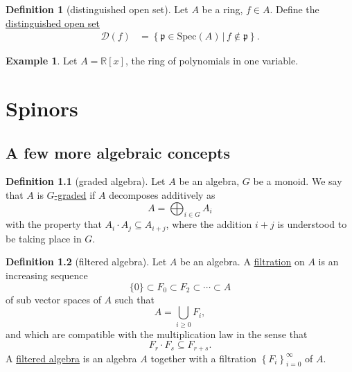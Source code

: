 \documentclass[a4paper]{report}
\newcommand{\R}{\mathbb{R}}
\newcommand{\defn}[1]{\ul{#1}}
\newcommand{\Spec}{\mathrm{Spec}}
\theoremstyle{definition}
\newtheorem{definition}{Definition}[section]
\newtheorem{example}{Example}[section]
\theoremstyle{plain}
\theoremstyle{remark}
\begin{document}
\begin{definition}[distinguished open set]
  \label{def:distinguishedopenset}
  Let $A$ be a ring, $f \in A$. Define the \defn{distinguished open set}
  \begin{align*}
    \mathcal{D}(f) &= \left\{ \mathfrak{p} \in \Spec(A)\,\big|\, f \notin \mathfrak{p} \right\}.
  \end{align*}
\end{definition}
\begin{example}
  Let $A = \R[x]$, the ring of polynomials in one variable.
\end{example}

\chapter{Spinors} 
\section{A few more algebraic concepts}
\begin{definition}[graded algebra]
  \label{def:gradedalgebra}
  Let $A$ be an algebra, $G$ be a monoid. We say that $A$ is \defn{$G$-graded} if $A$ decomposes additively as  \begin{equation*}
    A = \bigoplus_{i \in G} A_{i}
  \end{equation*}
  with the property that $A_{i} \cdot A_{j} \subseteq A_{i+j}$, where the addition $i+j$ is understood to be taking place in $G$.
\end{definition}

\begin{definition}[filtered algebra]
  \label{def:filteredalgebra}
  Let $A$ be an algebra. A \defn{filtration} on $A$ is an increasing sequence 
  \begin{equation*}
    \{0\} \subset F_{0} \subset F_{2} \subset \cdots \subset A
  \end{equation*}
  of sub vector spaces of $A$ such that
  \begin{equation*}
    A = \bigcup_{i\geq 0} F_{i},
  \end{equation*}
  and which are compatible with the multiplication law in the sense that
  \begin{equation*}
    F_{r} \cdot F_{s} \subseteq F_{r+s}.
  \end{equation*}
  A \defn{filtered algebra} is an algebra $A$ together with a filtration $\left\{ F_{i} \right\}_{i=0}^{\infty}$ of $A$.
\end{definition}
\end{document}
